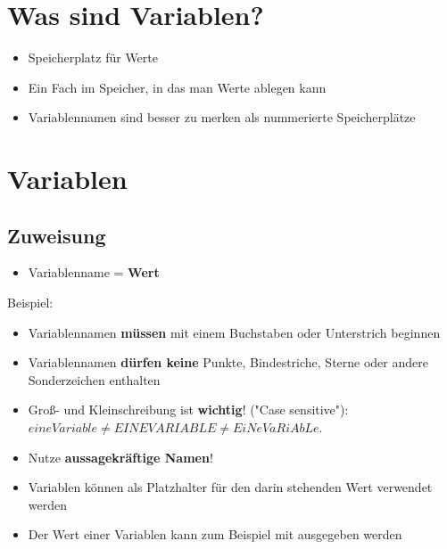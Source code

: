 



\subtitle{Variablen}
\maketitle

\tocslide

\section{Was sind Variablen?}
\begin{frame}[fragile]
	\slidehead
	\begin{itemize}
		\item Speicherplatz für Werte
		\item Ein Fach im Speicher, in das man Werte ablegen kann
		\item Variablennamen sind besser zu merken als nummerierte Speicherplätze
	\end{itemize}
\end{frame}

\section{Variablen}
\subsection{Zuweisung}
\begin{frame}
	\slidehead
	\begin{itemize}
		\item Variablenname = \textbf{Wert}
	\end{itemize}
	\pause
	Beispiel:
\end{frame}

\begin{frame}
	\slidehead

	\begin{itemize}
		\item Variablennamen \textbf{müssen} mit einem Buchstaben oder Unterstrich beginnen
		\item Variablennamen \textbf{dürfen keine} Punkte, Bindestriche, Sterne oder andere Sonderzeichen enthalten
		\pause
		\item Groß- und Kleinschreibung ist \textbf{wichtig}! ("Case sensitive"):\\ $eineVariable \neq EINEVARIABLE \neq EiNeVaRiAbLe$.
		\pause
		\item Nutze \textbf{aussagekräftige Namen}!
		\pause
		\item Variablen können als Platzhalter für den darin stehenden Wert verwendet werden
		\item Der Wert einer Variablen kann zum Beispiel mit  ausgegeben werden
	\end{itemize}
\end{frame}

